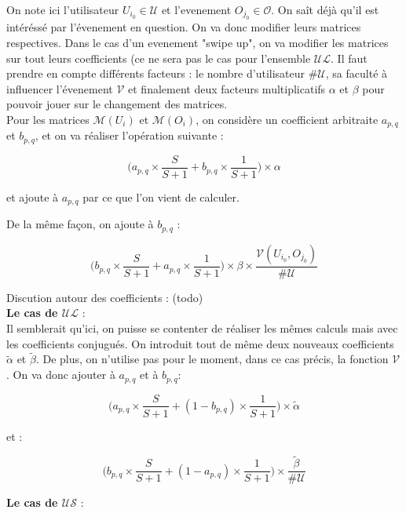 \documentclass[11pt, oneside]{article}
\begin{document}
On note ici l'utilisateur $U_{i_0} \in \mathcal{U}$ et l'evenement $O_{j_0} \in \mathcal{O}$. On saît déjà qu'il est intéréssé par l'évenement en question. On va donc modifier leurs matrices respectives. Dans le cas d'un evenement "swipe up", on va modifier les matrices sur tout leurs coefficients (ce ne sera pas le cas pour l'ensemble $\mathcal{UL}$. Il faut prendre en compte différents facteurs : le nombre d'utilisateur $\#\mathcal{U}$, sa faculté à influencer l'évenement $\mathcal{V}$ et finalement deux facteurs multiplicatifs $\alpha$ et $\beta$ pour pouvoir jouer sur le changement des matrices. \\

Pour les matrices $\mathcal{M} (U_i)$ et $\mathcal{M} (O_i)$, on considère un coefficient arbitraite $a_{p,q}$ et $b_{p,q}$, et on va réaliser l'opération suivante :
\begin{center}
\[
 \big( a_{p,q} \times \frac{S}{S+1} + b_{p,q}\times \frac{1}{S+1} \big) \times \alpha
\]
\end{center}
et ajoute à $a_{p,q}$ par ce que l'on vient de calculer.

De la même façon, on ajoute à $b_{p,q}$ :
\begin{center}
\[
 \big( b_{p,q} \times \frac{S}{S+1} + a_{p,q}\times \frac{1}{S+1} \big) \times \beta \times \frac{\mathcal{V}(U_{i_0},O_{j_0})}{\#\mathcal{U}}
\]
\end{center}

Discution autour des coefficients : (todo) \\
\newpage
\textbf{Le cas de $\mathcal{UL}$} : \\

Il semblerait qu'ici, on puisse se contenter de réaliser les mêmes calculs mais avec les coefficients conjugués. On introduit tout de même deux nouveaux coefficients $\tilde{\alpha}$ et $\tilde{\beta}$. De plus, on n'utilise pas pour le moment, dans ce cas précis, la fonction $\mathcal{V}$. On va donc ajouter à $a_{p,q}$ et à $b_{p,q}$: 
\begin{center}
\[
 \big( a_{p,q} \times \frac{S}{S+1} + (1 - b_{p,q})\times \frac{1}{S+1} \big) \times\tilde{\alpha}
\]
\end{center}
et :
\begin{center}
\[
 \big( b_{p,q} \times \frac{S}{S+1} + (1 - a_{p,q})\times \frac{1}{S+1} \big) \times \frac{\mathcal{\tilde{\beta}}}{\#\mathcal{U}}
\]
\end{center}

\textbf{Le cas de $\mathcal{US}$} : \\
\end{document}
